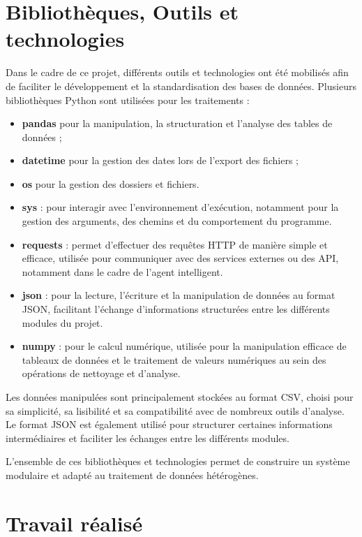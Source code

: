\documentclass[a4paper, 12pt, twoside]{article}
\begin{document}
\section{Bibliothèques, Outils et technologies}
Dans le cadre de ce projet, différents outils et technologies ont été mobilisés afin
de faciliter le développement et la standardisation des bases de données. Plusieurs bibliothèques Python sont utilisées pour les traitements :
\begin{itemize}
    \item \textbf{pandas} pour la manipulation, la structuration et l’analyse des tables de données ;
    \item \textbf{datetime} pour la gestion des dates lors de l’export des fichiers ;
    \item \textbf{os} pour la gestion des dossiers et fichiers.
    \item \textbf{sys} : pour interagir avec l’environnement d’exécution, notamment pour la gestion des arguments, des chemins et du comportement du programme.
    \item \textbf{requests} : permet d’effectuer des requêtes HTTP de manière simple et efficace, utilisée pour communiquer avec des services externes ou des API, notamment dans le cadre de l’agent intelligent.
    \item \textbf{json} : pour la lecture, l’écriture et la manipulation de données au format JSON, facilitant l’échange d’informations structurées entre les différents modules du projet.
    \item \textbf{numpy} : pour le calcul numérique, utilisée pour la manipulation efficace de tableaux de données et le traitement de valeurs numériques au sein des opérations de nettoyage et d’analyse.
\end{itemize}
Les données manipulées sont principalement stockées au format CSV, choisi pour sa simplicité, sa lisibilité et sa compatibilité avec de nombreux outils d’analyse. Le format JSON est également utilisé pour structurer certaines informations intermédiaires et faciliter les échanges entre les différents modules.

L’ensemble de ces bibliothèques et technologies permet de construire un système modulaire et adapté au traitement de données hétérogènes.

\newpage
\section{Travail réalisé}
\end{document}
